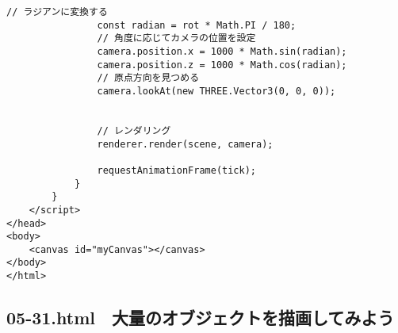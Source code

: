 \documentclass[mingoth,11pt,a4j,uplatex]{jsarticle}
\begin{document}
\begin{lstlisting}[caption=05-23.html]
                // ラジアンに変換する
                const radian = rot * Math.PI / 180;
                // 角度に応じてカメラの位置を設定
                camera.position.x = 1000 * Math.sin(radian);
                camera.position.z = 1000 * Math.cos(radian);
                // 原点方向を見つめる
                camera.lookAt(new THREE.Vector3(0, 0, 0));


                // レンダリング
                renderer.render(scene, camera);

                requestAnimationFrame(tick);
            }
        }
    </script>
</head>
<body>
    <canvas id="myCanvas"></canvas>
</body>
</html>
\end{lstlisting}

\subsection{05-31.html　大量のオブジェクトを描画してみよう}
\end{document}
